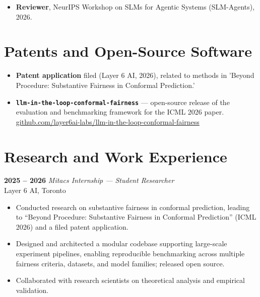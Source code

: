 \documentclass[11pt,letterpaper]{article}
\begin{document}
\begin{itemize}[leftmargin=0.5cm]
	\item \textbf{Reviewer}, NeurIPS Workshop on SLMs for Agentic Systems (SLM-Agents), 2026.
\end{itemize}

\vspace{0.2cm}


\section*{Patents and Open-Source Software}

\begin{itemize}[leftmargin=0.5cm]
	\item \textbf{Patent application} filed (Layer 6 AI, 2026), related to methods in 'Beyond Procedure: Substantive Fairness in Conformal Prediction.'
	\item \textbf{\texttt{llm-in-the-loop-conformal-fairness}} --- open-source release of the evaluation
	      and benchmarking framework for the ICML 2026 paper.
	      \href{https://github.com/layer6ai-labs/llm-in-the-loop-conformal-fairness}{github.com/layer6ai-labs/llm-in-the-loop-conformal-fairness}
\end{itemize}

\vspace{0.2cm}


\section*{Research and Work Experience}

\noindent
\textbf{2025 -- 2026} \hfill \textit{Mitacs Internship --- Student Researcher} \\
Layer 6 AI, Toronto

\begin{itemize}[leftmargin=0.5cm]
	\item Conducted research on substantive fairness in conformal prediction, leading to
	      ``Beyond Procedure: Substantive Fairness in Conformal Prediction'' (ICML 2026) and a filed patent application.
	\item Designed and architected a modular codebase supporting large-scale experiment pipelines, enabling reproducible benchmarking across multiple fairness criteria, datasets, and model families; released open source.
	\item Collaborated with research scientists on theoretical analysis and empirical validation.
\end{itemize}
\end{document}

